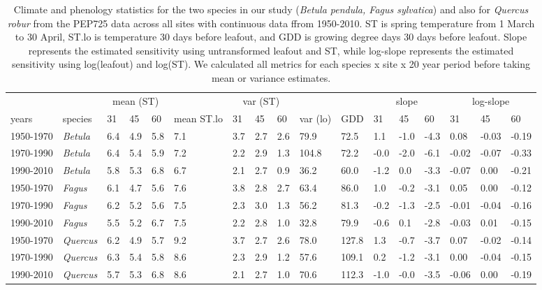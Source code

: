 \documentclass[11pt]{article}
\begin{document}
\begin{table}[ht]
\centering
\caption{Climate and phenology statistics for the two species in our study (\emph{Betula pendula, Fagus sylvatica}) and also for \emph{Quercus robur} from the PEP725 data across all sites with continuous data ffrom 1950-2010. ST is spring temperature from 1 March to 30 April, ST.lo is temperature 30 days before leafout, and GDD is growing degree days 30 days before leafout. Slope represents the estimated sensitivity using untransformed leafout and ST, while log-slope represents the estimated sensitivity using log(leafout) and log(ST). We calculated all metrics for each species  x site x 20 year period before taking mean or variance estimates.} 
\label{tab:pep20yr}
\begingroup\footnotesize
\begin{tabular}{|p{}|p{}|p{}|p{}|p{}|p{}|p{}|p{}|p{}|p{}|p{}|p{}|p{}|p{}|p{}|p{}|p{}|}
  \hline
\multicolumn{1}{|c|}{} & \multicolumn{1}{|c|}{} & \multicolumn{3}{|c|}{mean (ST)} & \multicolumn{1}{|c|}{} & \multicolumn{3}{|c|}{var (ST)} & \multicolumn{1}{|c|}{} & \multicolumn{1}{|c|}{} & \multicolumn{3}{|c|}{slope} & \multicolumn{3}{|c|}{log-slope} \\  \cline{3-5} \cline{7-9} \cline{12-14} \cline{15-17}
  years & species & 31 & 45 & 60 & mean ST.lo & 31 & 45 & 60 & var (lo) & GDD & 31 & 45 & 60 & 31 & 45 & 60 \\ 
  \hline
1950-1970 & \emph{Betula} & 6.4 & 4.9 & 5.8 & 7.1 & 3.7 & 2.7 & 2.6 & 79.9 & 72.5 & 1.1 & -1.0 & -4.3 & 0.08 & -0.03 & -0.19 \\ 
  1970-1990 & \emph{Betula} & 6.4 & 5.4 & 5.9 & 7.2 & 2.2 & 2.9 & 1.3 & 104.8 & 72.2 & -0.0 & -2.0 & -6.1 & -0.02 & -0.07 & -0.33 \\ 
  1990-2010 & \emph{Betula} & 5.8 & 5.3 & 6.8 & 6.7 & 2.1 & 2.7 & 0.9 & 36.2 & 60.0 & -1.2 & 0.0 & -3.3 & -0.07 & 0.00 & -0.21 \\ 
  1950-1970 & \emph{Fagus} & 6.1 & 4.7 & 5.6 & 7.6 & 3.8 & 2.8 & 2.7 & 63.4 & 86.0 & 1.0 & -0.2 & -3.1 & 0.05 & 0.00 & -0.12 \\ 
  1970-1990 & \emph{Fagus} & 6.2 & 5.2 & 5.6 & 7.5 & 2.3 & 3.0 & 1.3 & 56.2 & 81.3 & -0.2 & -1.3 & -2.5 & -0.01 & -0.04 & -0.16 \\ 
  1990-2010 & \emph{Fagus} & 5.5 & 5.2 & 6.7 & 7.5 & 2.2 & 2.8 & 1.0 & 32.8 & 79.9 & -0.6 & 0.1 & -2.8 & -0.03 & 0.01 & -0.15 \\ 
  1950-1970 & \emph{Quercus} & 6.2 & 4.9 & 5.7 & 9.2 & 3.7 & 2.7 & 2.6 & 78.0 & 127.8 & 1.3 & -0.7 & -3.7 & 0.07 & -0.02 & -0.14 \\ 
  1970-1990 & \emph{Quercus} & 6.3 & 5.4 & 5.8 & 8.6 & 2.3 & 2.9 & 1.2 & 57.6 & 109.1 & 0.2 & -1.2 & -3.1 & 0.00 & -0.04 & -0.15 \\ 
  1990-2010 & \emph{Quercus} & 5.7 & 5.3 & 6.8 & 8.6 & 2.1 & 2.7 & 1.0 & 70.6 & 112.3 & -1.0 & -0.0 & -3.5 & -0.06 & 0.00 & -0.19 \\ 
   \hline
\end{tabular}
\endgroup
\end{table}
\end{document}
